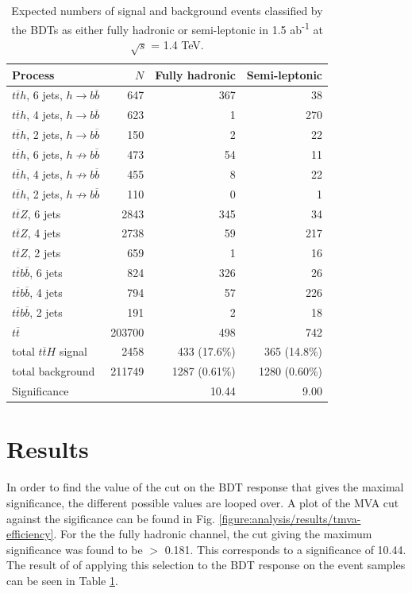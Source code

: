 \begin{table}[ht]
\centering
	\begin{tabular}{ l r r r }
	\hline \hline
	\textbf{Process} & \textbf{$N$} & \textbf{Fully hadronic} & \textbf{Semi-leptonic} \\ \hline
	$t\overline{t}h$, 6 jets, $h \rightarrow b\overline{b}$ & 647 & 367 & 38 \\
	$t\overline{t}h$, 4 jets, $h \rightarrow b\overline{b}$ & 623 & 1 & 270 \\ \hline
	$t\overline{t}h$, 2 jets, $h \rightarrow b\overline{b}$ & 150 & 2 & 22 \\

	$t\overline{t}h$, 6 jets, $h \not\rightarrow b\overline{b}$ & 473 & 54 & 11	 \\
	$t\overline{t}h$, 4 jets, $h \not\rightarrow b\overline{b}$ & 455 & 8 & 22\\
	$t\overline{t}h$, 2 jets, $h \not\rightarrow b\overline{b}$ & 110 & 0 & 1 \\

	$t\overline{t}Z$, 6 jets & 2843 & 345 & 34 \\
	$t\overline{t}Z$, 4 jets & 2738 & 59 & 217 \\
	$t\overline{t}Z$, 2 jets & 659 & 1 & 16 \\
	
	$t\overline{t}b\overline{b}$, 6 jets & 824 & 326 & 26 \\
	$t\overline{t}b\overline{b}$, 4 jets & 794 & 57 & 226 \\
	$t\overline{t}b\overline{b}$, 2 jets & 191 & 2 & 18 \\

	$t\overline{t}$ & 203700 & 498 & 742 \\ \hline

	total $t\overline{t}H$ signal & 2458 & 433 (17.6\%) & 365 (14.8\%) \\ 
	total background & 211749 & 1287 (0.61\%) & 1280 (0.60\%) \\
	Significance &   & 10.44 & 9.00 \\ \hline \hline

	\end{tabular}
	\caption{Expected numbers of signal and background events classified by the \acrshort{BDT}s as either fully hadronic or semi-leptonic in 1.5 ab\textsuperscript{-1} at $\sqrt{s}$ = 1.4 TeV.}
	\label{table:physics/SM/selections}
\end{table}

\section{Results}
In order to find the value of the cut on the \acrshort{BDT} response  that gives the maximal significance, the different possible values are looped over. A plot of the MVA cut against the sigificance can be found in Fig. \ref{figure:analysis/results/tmva-efficiency}. For the the fully hadronic channel, the cut giving the maximum significance was found to be $>$ 0.181. This corresponds to a significance of 10.44. The result of of applying this selection to the BDT response on the event samples can be seen in Table \ref{table:physics/SM/selections}.

